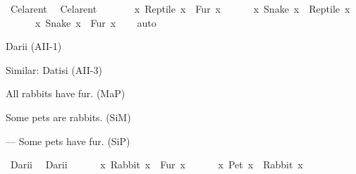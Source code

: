 \begin{isabellebody}
\begin{exercise}[subtitle=Silogizmi]
\ Celarent{\isacharcolon}{\kern0pt}\ %
\isadelimproof
%
\endisadelimproof
%
\isatagproof
%
\endisatagproof
{\isafoldproof}%
%
\isadelimproof
\isanewline
%
\endisadelimproof
{}\isamarkupfalse%
\ Celarent{\isacharcolon}{\kern0pt}\ {\isachardoublequoteopen}\isanewline
\ \ \ \ {\isacharparenleft}{\kern0pt}{\isasymnot}\ {\isacharparenleft}{\kern0pt}{\isasymexists}\ x{\isachardot}{\kern0pt}\ Reptile\ x\ {\isasymand}\ Fur\ x{\isacharparenright}{\kern0pt}{\isacharparenright}{\kern0pt}\ {\isasymand}\isanewline
\ \ \ \ {\isacharparenleft}{\kern0pt}{\isasymforall}\ x{\isachardot}{\kern0pt}\ Snake\ x\ {\isasymlongrightarrow}\ Reptile\ x{\isacharparenright}{\kern0pt}\ {\isasymlongrightarrow}\isanewline
\ \ \ \ {\isacharparenleft}{\kern0pt}{\isasymnot}\ {\isacharparenleft}{\kern0pt}{\isasymexists}\ x{\isachardot}{\kern0pt}\ Snake\ x\ {\isasymand}\ Fur\ x{\isacharparenright}{\kern0pt}{\isacharparenright}{\kern0pt}{\isachardoublequoteclose}\isanewline
%
\isadelimproof
\ \ %
\endisadelimproof
%
\isatagproof
{}\isamarkupfalse%
\ auto%
\endisatagproof
{\isafoldproof}%
%
\isadelimproof
%
\endisadelimproof
%
\begin{isamarkuptext}%
Darii (AII-1)%
\end{isamarkuptext}\isamarkuptrue%
%
\begin{isamarkuptext}%
Similar: Datisi (AII-3)%
\end{isamarkuptext}\isamarkuptrue%
%
\begin{isamarkuptext}%
All rabbits have fur. (MaP)%
\end{isamarkuptext}\isamarkuptrue%
%
\begin{isamarkuptext}%
Some pets are rabbits. (SiM)%
\end{isamarkuptext}\isamarkuptrue%
%
\begin{isamarkuptext}%
— Some pets have fur. (SiP)%
\end{isamarkuptext}\isamarkuptrue%
\isamarkupfalse%
\ Darii{\isacharcolon}{\kern0pt}\ %
\isadelimproof
%
\endisadelimproof
%
\isatagproof
%
\endisatagproof
{\isafoldproof}%
%
\isadelimproof
\isanewline
%
\endisadelimproof
{}\isamarkupfalse%
\ Darii{\isacharcolon}{\kern0pt}\ {\isachardoublequoteopen}\isanewline
\ \ \ \ {\isacharparenleft}{\kern0pt}{\isasymforall}\ x{\isachardot}{\kern0pt}\ Rabbit\ x\ {\isasymlongrightarrow}\ Fur\ x{\isacharparenright}{\kern0pt}\ {\isasymand}\isanewline
\ \ \ \ {\isacharparenleft}{\kern0pt}{\isasymexists}\ x{\isachardot}{\kern0pt}\ Pet\ x\ {\isasymand}\ Rabbit\ x{\isacharparenright}{\kern0pt}\ {\isasymlongrightarrow}\isanewline

\end{exercise}
\end{isabellebody}

